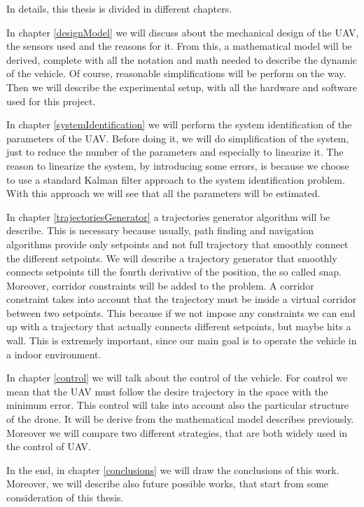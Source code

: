 \noindent In details, this thesis is divided in different chapters.

\noindent In chapter \ref{designModel} we will discuss about the mechanical design of the UAV, the sensors used and the reasons for it. From this, a mathematical model will be derived, complete with all the notation and math needed to describe the dynamic of the vehicle. Of course, reasonable simplifications will be perform on the way. Then we will describe the experimental setup, with all the hardware and software used for this project.

\noindent In chapter \ref{systemIdentification} we will perform the system identification of the parameters of the UAV. Before doing it, we will do simplification of the system, just to reduce the number of the parameters and especially to linearize it. The reason to linearize the system, by introducing some errors, is because we choose to use a standard Kalman filter approach to the system identification problem. With this approach we will see that all the parameters will be estimated.

\noindent In chapter \ref{trajectoriesGenerator} a trajectories generator algorithm will be describe. This is necessary because usually, path finding and navigation algorithms provide only setpoints and not full trajectory that smoothly connect the different setpoints. We will describe a trajectory generator that smoothly connects setpoints till the fourth derivative of the position, the so called snap. Moreover, corridor constraints will be added to the problem. A corridor constraint takes into account that the trajectory must be inside a virtual corridor between two setpoints. This because if we not impose any constraints we can end up with a trajectory that actually connects different setpoints, but maybe hits a wall. This is extremely important, since our main goal is to operate the vehicle in a indoor environment. 

\noindent In chapter \ref{control} we will talk about the control of the vehicle. For control we mean that the UAV must follow the desire trajectory in the space with the minimum error. This control will take into account also the particular structure of the drone. It will be derive from the mathematical model describes previously. Moreover we will compare two different strategies, that are both widely used in the control of UAV.

\noindent In the end, in chapter \ref{conclusions} we will draw the conclusions of this work. Moreover, we will describe also future possible works, that start from some consideration of this thesis. 